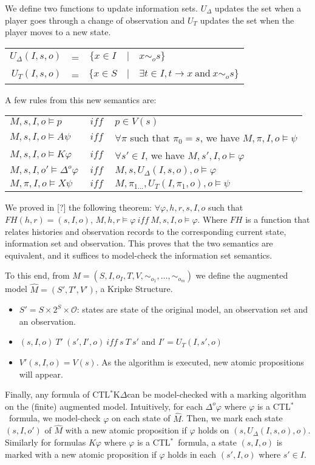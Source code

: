 \documentclass{acmart}
\def\ctls{CTL$^{*}$}
\def\ctlskd{CTL$^{*}$K$\Delta$}
\def\A{\mathit{A}}
\def\X{\mathit{X}}
\def\K{\mathit{K}}
\def\D#1{\Delta^{#1}}
\def\eqstate#1{\sim_{#1}}
\def\iff{\ \mathit{iff}\ }
\def\UD{U_{\Delta}}
\def\UT{U_T}
\def\FV{\mathit{FH}}
\begin{document}
We define two functions to update information sets. $\UD$ updates the set when a player goes through a change of observation and $\UT$ updates the set when the player moves to a new state. 
\begin{tabular}{r c c c l}
$\UD(I,s,o)$& = &$\{x\in I$ & $|$ & $x\eqstate{o}s\}$\\
$\UT(I,s,o)$& = &$\{x\in S$ & $|$ & $\exists t\in I, t\rightarrow x ~\text{and}~ x\eqstate{o}s\}$\\
\end{tabular}

A few rules from this new semantics are:
\begin{tabular}{l c l}
  $M,s,I,o\models p $&$ \iff $&$ p\in V(s)$\\
  $M,s,I,o\models\A\psi $&$ \iff $&$ \forall\pi$ such that $\pi_0=s$, we have $M,\pi,I,o\models\psi$\\
  $M,s,I,o\models\K\varphi $&$ \iff $&$ \forall s'\in I$, we have $M,s',I,o\models\varphi$\\
  $M,s,I,o'\models\D{o}\varphi $&$ \iff $&$ M,s,\UD(I,s,o),o\models\varphi$\\
  $M,\pi,I,o\models\X\psi $&$ \iff $&$ M,\pi_{1\dots},\UT(I,\pi_1,o),o\models\psi$\\
\end{tabular}

We proved in [?] the following theorem:
$\forall \varphi,h,r,s,I,o$ such that $\FV(h,r)=(s,I,o)$, $M,h,r\models\varphi\iff M,s,I,o\models\varphi$.
Where $\FV$ is a function that relates histories and observation records to the corresponding current state, information set and observation.
This proves that the two semantics are equivalent, and it suffices to model-check the information set semantics.

To this end, from $M=(S,I,o_I,T,V,\eqstate{o_1},\dots,\eqstate{o_m})$ we define the augmented model $\hat{M}=(S',T',V')$, a Kripke Structure.
\begin{itemize}
\item $S'=S\times 2^{S}\times \mathcal{O}$: states are state of the original model, an observation set and an observation.
\item $(s,I,o)~T'~(s',I',o)\iff s~T~s'$ and $I'=\UT(I,s',o)$
\item $V'(s,I,o)=V(s)$. As the algorithm is executed, new atomic propositions will appear.
\end{itemize}

Finally, any formula of \ctlskd can be model-checked with a marking algorithm on the (finite) augmented model.
Intuitively, for each $\D{o}\varphi$ where $\varphi$ is a \ctls\ formula, we model-check $\varphi$ on each state of $\hat{M}$.
Then, we mark each state $(s,I,o')$ of $\hat{M}$ with a new atomic proposition if $\varphi$ holds on $(s,\UD(I,s,o),o)$.
Similarly for formulas $\K\varphi$ where $\varphi$ is a \ctls\ formula, a state $(s,I,o)$ is marked with a new atomic proposition if $\varphi$ holds in each $(s',I,o)$ where $s'\in I$.
\end{document}
